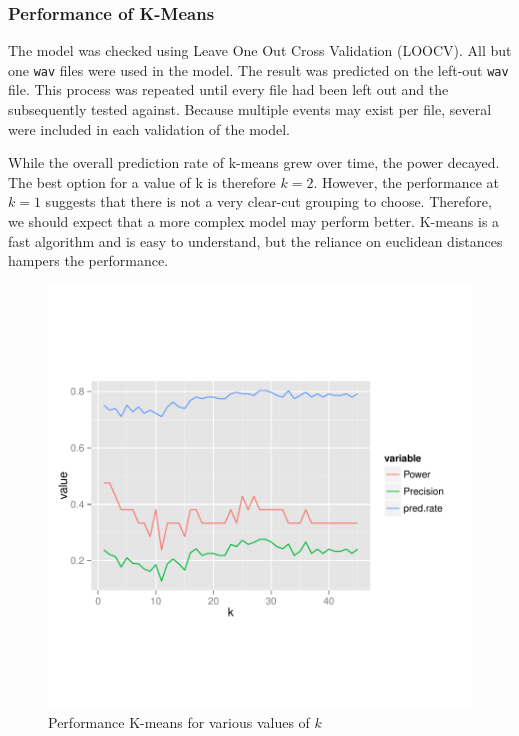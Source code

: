 \documentclass[paper=a4, fontsize=11pt]{scrartcl}
\numberwithin{equation}{section}
\numberwithin{figure}{section}
\numberwithin{table}{section}
\begin{document}
\subsubsection{Performance of K-Means}\label{subsubsec:LOOCV}
The model was checked using Leave One Out Cross Validation (LOOCV). All but one \texttt{wav} files were used in the model. The result was predicted on the left-out \texttt{wav} file. This process was repeated until every file had been left out and the subsequently tested against. Because multiple events may exist per file, several were included in each validation of the model.

While the overall prediction rate of k-means grew over time, the power decayed. The best option for a value of k is therefore $k=2$. However, the performance at $k=1$ suggests that there is not a very clear-cut grouping to choose. Therefore, we should expect that a more complex model may perform better. K-means is a fast algorithm and is easy to understand, but the reliance on euclidean distances hampers the performance.

\begin{figure}[H]
\begin{center}
\vspace{-100pt}
\includegraphics[width=\textwidth]{k_means.pdf}
\vspace{-120pt}
\caption{Performance K-means for various values of $k$}
\end{center}
\end{figure}
\end{document}
